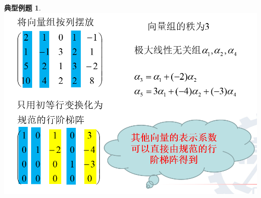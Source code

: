 \documentclass[12pt,oneside]{ctexbook}
\newtheorem{problem}[subsection]{典型例题}
\begin{document}
\begin{problem}
    \includegraphics[scale=0.4]{problem3.7.png}
\end{problem}
\end{document}
